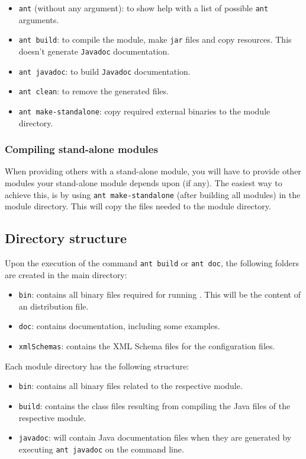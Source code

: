 \begin{itemize}
\item \verb|ant| (without any argument): to show help with a list of possible \verb|ant| arguments.
\item \verb|ant build|: to compile the module, make \verb|jar| files and copy resources. This doesn't generate \verb|Javadoc| documentation.
\item \verb|ant javadoc|: to build \verb|Javadoc| documentation.
\item \verb|ant clean|: to remove the generated files.
\item \verb|ant make-standalone|: copy required external binaries to the module directory.
\end{itemize}

\subsubsection{Compiling stand-alone modules}
When providing others with a stand-alone module, you will have to provide other modules your stand-alone module depends upon (if any). The easiest way to achieve this, is by using \verb|ant make-standalone| (after building all \oda modules) in the module directory. This will copy the files needed to the module directory.

\subsection{Directory structure}
Upon the execution of the command \verb|ant build| or \verb|ant doc|, the following folders are created in the main directory:

\begin{itemize}
\item \verb|bin|: contains all binary files required for running \oda. This will be the content of an \oda distribution file.
\item \verb|doc|: contains \oda documentation, including some examples.
\item \verb|xmlSchemas|: contains the XML Schema files for the \oda configuration files.
\end{itemize}

Each module directory has the following structure:

\begin{itemize}
\item \verb|bin|: contains all binary files related to the respective module.
\item \verb|build|: contains the class files resulting from compiling the Java files of the respective module.
\item \verb|javadoc|: will contain Java documentation files when they are generated by executing \verb|ant javadoc| on the command line.
\end{itemize}

